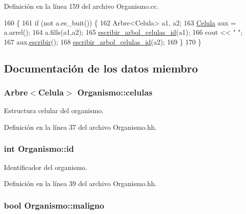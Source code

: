 Definición en la línea 159 del archivo Organismo.\+cc.


\begin{DoxyCode}
160 \{
161   \textcolor{keywordflow}{if} (not a.es\_buit()) \{
162     Arbre<Celula> a1, a2;
163     \hyperlink{class_celula}{Celula} aux = a.arrel();
164     a.fills(a1,a2);    
165     \hyperlink{class_organismo_ad29f7f44a5694136d0a3990581426cf0}{escribir\_arbol\_celulas\_id}(a1);
166     cout << \textcolor{stringliteral}{" "};
167     aux.\hyperlink{class_celula_ae16a94d28e49affafd260405414f37ad}{escribir}();
168     \hyperlink{class_organismo_ad29f7f44a5694136d0a3990581426cf0}{escribir\_arbol\_celulas\_id}(a2);
169   \}
170 \}
\end{DoxyCode}


\subsection{Documentación de los datos miembro}
\hypertarget{class_organismo_abfafb8e55144e295b406ce90951f0c68}{
\subsubsection[{celulas}]{\setlength{\rightskip}{0pt plus 5cm}Arbre$<${\bf Celula}$>$ Organismo\+::celulas\hspace{0.3cm}{\ttfamily [private]}}}\label{class_organismo_abfafb8e55144e295b406ce90951f0c68}


Estructura celular del organismo. 



Definición en la línea 37 del archivo Organismo.\+hh.

\hypertarget{class_organismo_a30be1823d3711fec651a5a4b1dc1cee5}{
\subsubsection[{id}]{\setlength{\rightskip}{0pt plus 5cm}int Organismo\+::id\hspace{0.3cm}{\ttfamily [private]}}}\label{class_organismo_a30be1823d3711fec651a5a4b1dc1cee5}


Identificador del organismo. 



Definición en la línea 39 del archivo Organismo.\+hh.

\hypertarget{class_organismo_a85a5d1b9d31fa209d1ed0d596dbbed61}{
\subsubsection[{maligno}]{\setlength{\rightskip}{0pt plus 5cm}bool Organismo\+::maligno\hspace{0.3cm}{\ttfamily [private]}}}\label{class_organismo_a85a5d1b9d31fa209d1ed0d596dbbed61}


